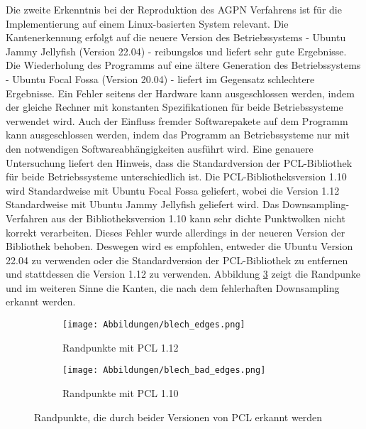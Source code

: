 Die zweite Erkenntnis bei der Reproduktion des AGPN Verfahrens ist für die Implementierung auf einem Linux-basierten System relevant. Die Kantenerkennung erfolgt auf die neuere Version des Betriebssystems - Ubuntu Jammy Jellyfish (Version 22.04) - reibungslos und liefert sehr gute Ergebnisse. Die Wiederholung des Programms auf eine ältere Generation des Betriebssystems - Ubuntu Focal Fossa (Version 20.04) - liefert im Gegensatz schlechtere Ergebnisse. Ein Fehler seitens der Hardware kann ausgeschlossen werden, indem der gleiche Rechner mit konstanten Spezifikationen für beide Betriebssysteme verwendet wird. Auch der Einfluss fremder Softwarepakete auf dem Programm kann ausgeschlossen werden, indem das Programm an Betriebssysteme nur mit den notwendigen Softwareabhängigkeiten ausführt wird. Eine genauere Untersuchung liefert den Hinweis, dass die Standardversion der PCL-Bibliothek für beide Betriebssysteme unterschiedlich ist. Die PCL-Bibliotheksversion 1.10 wird Standardweise mit Ubuntu Focal Fossa geliefert, wobei die Version 1.12 Standardweise mit Ubuntu Jammy Jellyfish geliefert wird. Das Downsampling-Verfahren aus der Bibliotheksversion 1.10 kann sehr dichte Punktwolken nicht korrekt verarbeiten. Dieses Fehler wurde allerdings in der neueren Version der Bibliothek behoben. Deswegen wird es empfohlen, entweder die Ubuntu Version 22.04 zu verwenden oder die Standardversion der PCL-Bibliothek zu entfernen und stattdessen die Version 1.12 zu verwenden. Abbildung \ref{fig: pcl_version_comparision} zeigt die Randpunke und im weiteren Sinne die Kanten, die nach dem fehlerhaften Downsampling erkannt werden.

\begin{figure}[h]
	\centering
	\begin{subfigure}[h]{0.95\textwidth}
		\texttt{[image: Abbildungen/blech\_edges.png]}
		\centering
		\caption{Randpunkte mit PCL 1.12}
		\label{fig: blech_edges}
	\end{subfigure}
	\hfill
	\begin{subfigure}[h]{0.95\textwidth}
		\texttt{[image: Abbildungen/blech\_bad\_edges.png]}
		\centering
		\caption{Randpunkte mit PCL 1.10}
		\label{fig: bad_edges}
	\end{subfigure}
	\caption{Randpunkte, die durch beider Versionen von PCL erkannt werden}
	\label{fig: pcl_version_comparision}
\end{figure}


